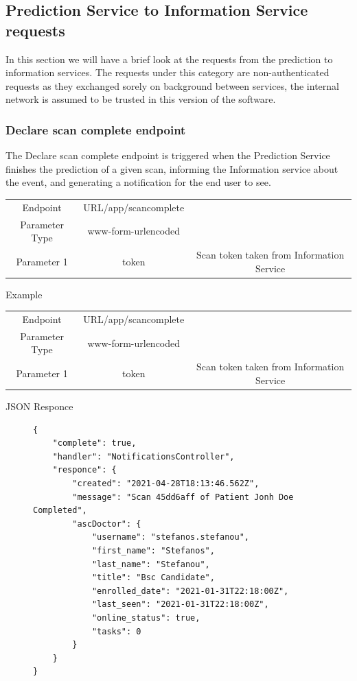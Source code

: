 			\subsection{Prediction Service to Information Service requests}
				In this section we will have a brief look at the requests from the prediction to information services. The requests under
				this category are non-authenticated requests as they exchanged sorely on background between services, the internal network
				is assumed to be trusted in this version of the software.
				\subsubsection{Declare scan complete endpoint}
					The Declare scan complete endpoint is triggered when the Prediction Service finishes the prediction of a given scan, informing
					the Information service about the event, and generating a notification for the end user to see.
					\begin{center}
						\begin{tabular}{ |c|c|c| } 
							\hline
							Endpoint & {{URL}}/app/scancomplete& \\
							Parameter Type & www-form-urlencoded  &\\
							Parameter 1 & token  & Scan token taken from Information Service\\
							\hline
						\end{tabular}
					\end{center}
					Example
					\begin{center}
						\begin{tabular}{ |c|c|c| } 
							\hline
							Endpoint & {{URL}}/app/scancomplete& \\
							Parameter Type & www-form-urlencoded  &\\
							Parameter 1 & token  & Scan token taken from Information Service\\
							\hline
						\end{tabular}
					\end{center}
					JSON Responce
					\begin{figure}[H]
						\iftrue
						\begin{lstlisting}[]
{
	"complete": true,
	"handler": "NotificationsController",
	"responce": {
		"created": "2021-04-28T18:13:46.562Z",
		"message": "Scan 45dd6aff of Patient Jonh Doe Completed",
		"ascDoctor": {
			"username": "stefanos.stefanou",
			"first_name": "Stefanos",
			"last_name": "Stefanou",
			"title": "Bsc Candidate",
			"enrolled_date": "2021-01-31T22:18:00Z",
			"last_seen": "2021-01-31T22:18:00Z",
			"online_status": true,
			"tasks": 0
		}
	}
}
						\end{lstlisting}
					\end{figure}
